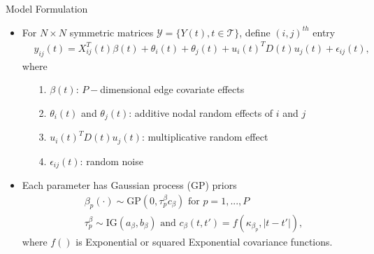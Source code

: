 \documentclass[10pt]{beamer}
\def\bni{\begin{itemize}} \def\ei{\end{itemize}}
\theoremstyle{definition}
\theoremstyle{remark}
\begin{document}
\begin{frame}{Model Formulation}
	\bni
	\item For $N \times N$ symmetric matrices $\mathcal{Y}=\{Y(t), t \in \mathcal{T}\}$, define $(i, j)^{th}$ entry
	 \begin{equation*}
	\begin{aligned}
	&y_{ij}(t)=X^T_{ij}(t)\beta(t)+\theta_i(t)+\theta_j(t)+{u_i(t)^TD(t)u_j(t)}+\epsilon_{ij}(t),
	\end{aligned}
	\end{equation*}
	where
	\begin{itemize}
		\item[1.] $\beta(t)$: $P-$dimensional edge covariate effects 
		\item[2.] $\theta_i(t)$ and $\theta_j(t)$: additive nodal random effects of $i$ and $j$
		\item[3.] $u_i(t)^TD(t)u_j(t)$: multiplicative random effect
		\item[4.] $\epsilon_{ij}(t)$: random noise
	\end{itemize}\vspace{0.4cm}
	\item Each parameter has Gaussian process (GP) priors
	 \begin{equation*}
	 \begin{aligned}
	 &\beta_{p}(\cdot) \sim \mbox{GP}(0, \tau^{\beta}_pc_\beta)\mbox{ for }p = 1,...,P\\& 
	 \tau^{\beta}_p \sim \mbox{IG}(a_\beta, b_\beta) \mbox{ and } c_\beta(t, t')=f(\kappa_{\beta_p}, |t-t'|),
	 \end{aligned}
	 \end{equation*}
	 where $f()$ is Exponential or squared Exponential covariance functions.
	\ei
\end{frame}
\end{document}
